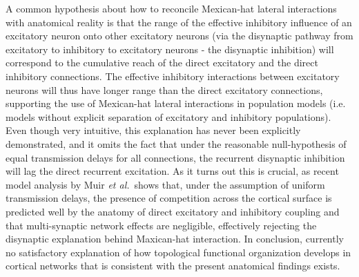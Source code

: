 \documentclass[utf8]{frontiersSCNS}
\newcommand{\etal}{\textit{et al.}}
\begin{document}
A common hypothesis about how to reconcile Mexican-hat lateral interactions with anatomical reality is that the range of the effective inhibitory influence of an excitatory neuron 
onto other excitatory neurons (via the disynaptic pathway from excitatory to inhibitory to excitatory neurons - the disynaptic inhibition) will correspond to the cumulative reach 
of the direct excitatory and the direct inhibitory connections. The effective
inhibitory interactions between excitatory neurons will thus have longer range than the direct excitatory connections, supporting the use
of Mexican-hat lateral interactions in population models (i.e. models without explicit separation of excitatory and
inhibitory populations). Even though very intuitive, this explanation has never been explicitly demonstrated, and  
it omits the fact that under the reasonable null-hypothesis of equal transmission delays for all connections, 
the recurrent disynaptic inhibition will lag the direct recurrent excitation. As it turns out this is crucial, 
as recent model analysis by Muir \etal\,\citep{Muir2014} shows that, under the assumption of uniform transmission delays, 
the presence of competition across the cortical surface is predicted well by the anatomy of direct excitatory and inhibitory coupling and that multi-synaptic 
network effects are negligible, effectively rejecting the disynaptic explanation behind Maxican-hat interaction. 
In conclusion, currently no satisfactory explanation of how topological functional organization develops in cortical networks that is consistent with the present anatomical findings exists. 
\end{document}
